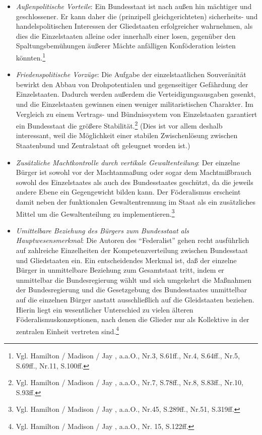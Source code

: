 \documentclass[a4paper,12pt]{article}
\begin{document}
\begin{itemize}
\item {\em Außenpolitische Vorteile}: Ein Bundesstaat ist nach
außen hin mächtiger und geschlossener. Er kann daher die
(prinzipell gleichgerichteten) sicherheits- und handelspolitischen
Interessen der Gliedstaaten erfolgreicher wahrnehmen, als dies die
Einzelstaaten alleine oder innerhalb einer losen, gegenüber
den Spaltungsbemühungen äußerer Mächte anfälligen Konföderation leisten
könnten.\footnote{Vgl. Hamilton / Madison / Jay \cite{hamilton},
a.a.O., Nr.3, S.61ff., Nr.4, S.64ff., Nr.5, S.69ff., Nr.11,
S.100ff.}

\item {\em Friedenspolitische Vorzüge}: Die Aufgabe der
einzelstaatlichen Souveränität bewirkt den Abbau von
Drohpotentialen und gegenseitiger Gefährdung der
Einzelstaaten. Dadurch werden außerdem die Verteidigungsausgaben
gesenkt, und die Einzelstaaten gewinnen einen weniger
militaristischen Charakter. Im Vergleich zu einem Vertrags- und
Bündnissystem von Einzelstaaten garantiert ein Bundesstaat die
größere Stabilität.\footnote{Vgl. Hamilton / Madison / Jay
\cite{hamilton}, a.a.O., Nr.7, S.78ff., Nr.8, S.83ff., Nr.10,
S.93ff.} (Dies ist vor allem deshalb interessant, weil die
Möglichkeit einer stabilen Zwischenlösung zwischen Staatenbund und
Zentralstaat oft geleugnet worden ist.)

\item {\em Zusätzliche Machtkontrolle durch vertikale
Gewaltenteilung}: Der einzelne Bürger ist sowohl vor der Machtanmaßung oder
sogar dem Machtmißbrauch sowohl des Einzelstaates als auch des Bundesstaates
geschützt, da die jeweils andere Ebene ein Gegengewicht bilden
kann. Der Föderalismus erscheint damit neben der funktionalen
Gewaltentrennung im Staat als ein zusätzliches Mittel um die
Gewaltenteilung zu implementieren.\footnote{Vgl. Hamilton / Madison
/ Jay \cite{hamilton}, a.a.O., Nr.45, S.289ff., Nr.51, S.319ff.}

\item {\em Umittelbare Beziehung des Bürgers zum Bundesstaat als
Hauptwesensmerkmal}: Die Autoren des "`Federalist"' gehen recht
ausführlich auf zahlreiche Einzelheiten der Kompetenzverteilung
zwischen Bundesstaat und Gliedstaaten ein. Ein entscheidendes
Merkmal ist, daß der einzelne Bürger in unmittelbare Beziehung zum
Gesamtstaat tritt, indem er unmittelbar die Bundesregierung wählt
und sich umgekehrt die Maßnahmen der Bundesregierung und die
Gesetzgebung des Bundesstaates unmittelbar auf die einzelnen Bürger
anstatt ausschließlich auf die Gleidstaaten beziehen. Hierin liegt
ein wesentlicher Unterschied zu vielen älteren
Föderalismuskonzeptionen, nach denen die Glieder nur als Kollektive
in der zentralen Einheit vertreten sind.\footnote{Vgl. Hamilton /
Madison / Jay \cite{hamilton}, a.a.O., Nr. 15, S.122ff.}
\end{itemize}
\end{document}
